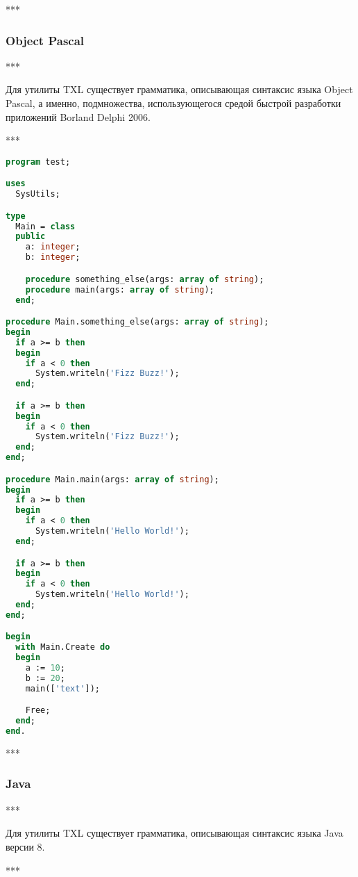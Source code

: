 ***

\subsubsection{Object Pascal}

***

Для утилиты TXL существует грамматика, описывающая синтаксис языка Object Pascal, а именно, подмножества, использующегося средой быстрой разработки приложений Borland Delphi 2006.

***

\begin{lstlisting}[frame=single, language=Pascal, label={test-delphi}, caption={Исходный текст тестового приложения.}]
program test;

uses
  SysUtils;

type
  Main = class
  public
    a: integer;
    b: integer;

    procedure something_else(args: array of string);
    procedure main(args: array of string);
  end;

procedure Main.something_else(args: array of string);
begin
  if a >= b then
  begin
    if a < 0 then
      System.writeln('Fizz Buzz!');
  end;

  if a >= b then
  begin
    if a < 0 then
      System.writeln('Fizz Buzz!');
  end;
end;

procedure Main.main(args: array of string);
begin
  if a >= b then
  begin
    if a < 0 then
      System.writeln('Hello World!');
  end;

  if a >= b then
  begin
    if a < 0 then
      System.writeln('Hello World!');
  end;
end;

begin
  with Main.Create do
  begin
    a := 10;
    b := 20;
    main(['text']);

    Free;
  end;
end.
\end{lstlisting}

***

\subsubsection{Java}

***

Для утилиты TXL существует грамматика, описывающая синтаксис языка Java версии 8.

***

